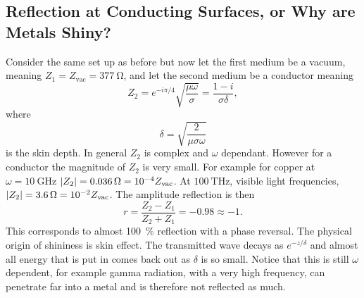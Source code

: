     \subsection{Reflection at Conducting Surfaces, or Why are Metals Shiny?}
    Consider the same set up as before but now let the first medium be a vacuum, meaning \(Z_1 = Z_{\text{vac}} = \SI{377}{\ohm}\), and let the second medium be a conductor meaning
    \[Z_2 = e^{-i\pi/4}\sqrt{\frac{\mu\omega}{\sigma}} = \frac{1 - i}{\sigma\delta},\]
    where
    \[\delta = \sqrt{\frac{2}{\mu\sigma\omega}}\]
    is the skin depth.
    In general \(Z_2\) is complex and \(\omega\) dependant.
    However for a conductor the magnitude of \(Z_2\) is very small.
    For example for copper at \(\omega = \SI{10}{\giga\hertz}\) \(\abs{Z_2} = \SI{0.036}{\ohm} = 10^{-4}Z_{\text{vac}}\).
    At \(\SI{100}{\tera\hertz}\), visible light frequencies, \(\abs{Z_2} = \SI{3.6}{\ohm} = 10^{-2}Z_{\text{vac}}\).
    The amplitude reflection is then
    \[r = \frac{Z_2 - Z_1}{Z_2 + Z_1} = -0.98 \approx -1.\]
    This corresponds to almost \SI{100}{\percent} reflection with a phase reversal.
    The physical origin of shininess is skin effect.
    The transmitted wave decays as \(e^{-z/\delta}\) and almost all energy that is put in comes back out as \(\delta\) is so small.
    Notice that this is still \(\omega\) dependent, for example gamma radiation, with a very high frequency, can penetrate far into a metal and is therefore not reflected as much.